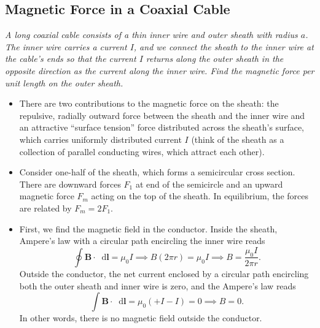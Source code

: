 \documentclass[11pt, a4paper]{article}
\newcommand{\diff}{\mathop{}\!\mathrm{d}} %
\renewcommand{\vec}[1]{\bm{#1}} %
\begin{document}
\subsection{Magnetic Force in a Coaxial Cable}
\textit{A long coaxial cable consists of a thin inner wire and outer sheath with radius $ a $. The inner wire carries a current $ I $, and we connect the sheath to the inner wire at the cable's ends so that the current $ I $ returns along the outer sheath in the opposite direction as the current along the inner wire. Find the magnetic force per unit length on the outer sheath.}

\begin{itemize}
	\item There are two contributions to the magnetic force on the sheath: the repulsive, radially outward force between the sheath and the inner wire and an attractive ``surface tension'' force distributed across the sheath's surface, which carries uniformly distributed current $ I $ (think of the sheath as a collection of parallel conducting wires, which attract each other).
	
	\item Consider one-half of the sheath, which forms a semicircular cross section. There are downward forces $ F_{1} $ at end of the semicircle and an upward magnetic force $ F_{m} $ acting on the top of the sheath. In equilibrium, the forces are related by $ F_{m} = 2F_{1} $.
	
	\item First, we find the magnetic field in the conductor. Inside the sheath, Ampere's law with a circular path encircling the inner wire reads
	\begin{equation*}
		\oint \vec{B} \cdot \diff \bm{l} = \mu_{0} I \implies B (2\pi r) = \mu_{0}I \implies B = \frac{\mu_{0}I}{2\pi r}.
	\end{equation*}
	Outside the conductor, the net current enclosed by a circular path encircling both the outer sheath and inner wire is zero, and the Ampere's law reads
	\begin{equation*}
		\int \vec{B} \cdot \diff \bm{l} = \mu_{0} (+I - I) = 0 \implies B = 0.
	\end{equation*}
	In other words, there is no magnetic field outside the conductor.
	

\end{itemize}
\end{document}
